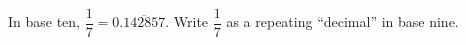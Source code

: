 In base ten, $\dfrac{1}{7}=0.\overline{142857}$. Write $\dfrac{1}{7}$ as a repeating ``decimal'' in base nine.

